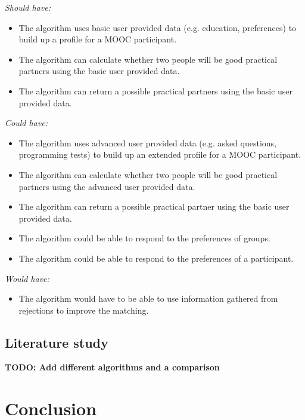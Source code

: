 \documentclass[]{article}
\newcommand{\TODO}[1]{{\color{red}\textbf{TODO: #1}}}
\newcommand{\reqr}[1]{{\noindent\emph{#1:}}}
\begin{document}
\reqr{Should have}
\begin{itemize}
\item The algorithm uses basic user provided data (e.g. education, preferences) to build up a profile for a MOOC participant.
\item The algorithm can calculate whether two people will be good practical partners using the basic user provided data.
\item The algorithm can return a possible practical partners using the basic user provided data.
\end{itemize}

\reqr{Could have}
\begin{itemize}
\item The algorithm uses advanced user provided data (e.g. asked questions, programming tests) to build up an extended profile for a MOOC participant.
\item The algorithm can calculate whether two people will be good practical partners using the advanced user provided data.
\item The algorithm can return a possible practical partner using the basic user provided data.
\item The algorithm could be able to respond to the preferences of groups.
\item The algorithm could be able to respond to the preferences of a participant.
\end{itemize}

\reqr{Would have}
\begin{itemize}
\item The algorithm would have to be able to use information gathered from rejections to improve the matching.
\end{itemize}

\subsection{Literature study}
\cite{cmu}
\TODO{Add different algorithms and a comparison}

\section{Conclusion}

\newpage


\end{document}
